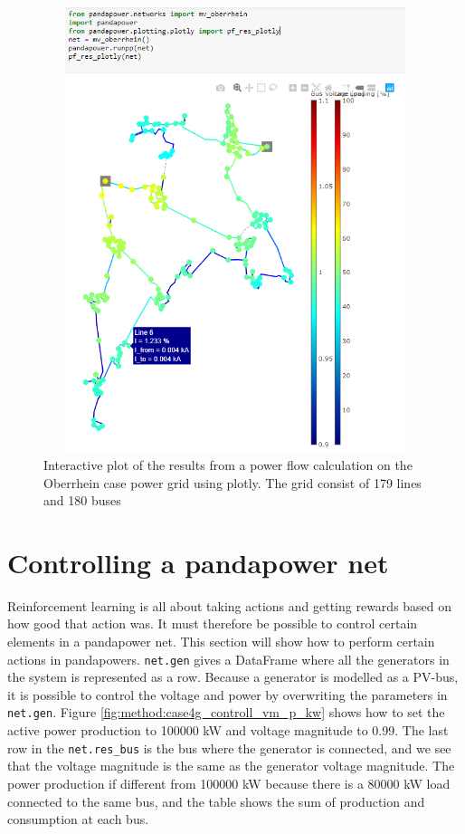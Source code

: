 \documentclass[class=book, crop=false]{standalone}
\begin{document}
\begin{figure}[H]
    \center
    \includegraphics[height=13cm, width=12cm]{figures/results_pp_oberrhein.png}
    \caption[size = 9]{Interactive plot of the results from a power flow calculation on the Oberrhein case power grid using plotly. The grid consist of 179 lines and 180 buses}
    \label{fig:method:oberrhein_grid_results_plotly}
\end{figure}


\section{Controlling a pandapower net}
Reinforcement learning is all about taking actions and getting rewards based on how good that action was. It must therefore be possible to control certain elements in a pandapower net. This section will show how to perform certain actions in pandapowers. \texttt{net.gen} gives a DataFrame where all the generators in the system is represented as a row. Because a generator is modelled as a PV-bus, it is possible to control the voltage and power by overwriting the parameters in \texttt{net.gen}. Figure \ref{fig:method:case4g_controll_vm_p_kw} shows how to set the active power production to 100000 kW and voltage magnitude to 0.99. The last row in the \texttt{net.res\_bus} is the bus where the generator is connected, and we see that the voltage magnitude is the same as the generator voltage magnitude. The power production if different from 100000 kW because there is a 80000 kW load connected to the same bus, and the table shows the sum of production and consumption at each bus. 
\end{document}
